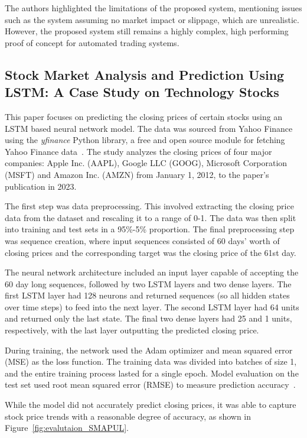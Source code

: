 \documentclass[a4paper,oneside,onecolumn,12pt]{book}
\begin{document}
	The authors highlighted the limitations of the proposed system, mentioning issues such as the system assuming no market impact or slippage, which are unrealistic. However, the proposed system still remains a highly complex, high performing proof of concept for automated trading systems.

	\subsection{Stock Market Analysis and Prediction Using LSTM: A Case Study on Technology Stocks~\cite{LiYuXuLiuMo2023}}
	This paper focuses on predicting the closing prices of certain stocks using an LSTM based neural network model. The data was sourced from Yahoo Finance using the \textit{yfinance} Python library, a free and open source module for fetching Yahoo Finance data~\cite{yfinance}. The study analyzes the closing prices of four major companies: Apple Inc. (AAPL), Google LLC (GOOG), Microsoft Corporation (MSFT) and Amazon Inc. (AMZN) from January 1, 2012, to the paper's publication in 2023.

	The first step was data preprocessing. This involved extracting the closing price data from the dataset and rescaling it to a range of 0-1. The data was then split into training and test sets in a 95\%-5\% proportion. The final preprocessing step was sequence creation, where input sequences consisted of 60 days' worth of closing prices and the corresponding target was the closing price of the 61st day.

	The neural network architecture included an input layer capable of accepting the 60 day long sequences, followed by two LSTM layers and two dense layers. The first LSTM layer had 128 neurons and returned sequences (so all hidden states over time steps) to feed into the next layer. The second LSTM layer had 64 units and returned only the last state. The final two dense layers had 25 and 1 units, respectively, with the last layer outputting the predicted closing price.

	During training, the network used the Adam optimizer and mean squared error (MSE) as the loss function. The training data was divided into batches of size 1, and the entire training process lasted for a single epoch. Model evaluation on the test set used root mean squared error (RMSE) to measure prediction accuracy~\cite{LiYuXuLiuMo2023}.

	While the model did not accurately predict closing prices, it was able to capture stock price trends with a reasonable degree of accuracy, as shown in Figure~\ref{fig:evalutaion_SMAPUL}.
	
\end{document}
